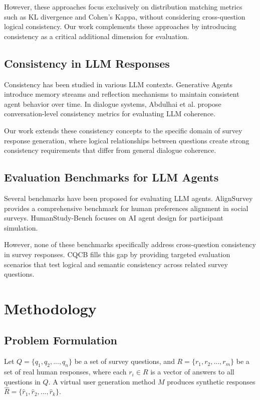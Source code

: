 \documentclass[sigconf, anonymous]{acmart}
\begin{document}
However, these approaches focus exclusively on distribution matching metrics such as KL divergence and Cohen's Kappa, without considering cross-question logical consistency. Our work complements these approaches by introducing consistency as a critical additional dimension for evaluation.

\subsection{Consistency in LLM Responses}

Consistency has been studied in various LLM contexts. Generative Agents introduce memory streams and reflection mechanisms to maintain consistent agent behavior over time. In dialogue systems, Abdulhai et al. propose conversation-level consistency metrics for evaluating LLM coherence.

Our work extends these consistency concepts to the specific domain of survey response generation, where logical relationships between questions create strong consistency requirements that differ from general dialogue coherence.

\subsection{Evaluation Benchmarks for LLM Agents}

Several benchmarks have been proposed for evaluating LLM agents. AlignSurvey provides a comprehensive benchmark for human preferences alignment in social surveys. HumanStudy-Bench focuses on AI agent design for participant simulation.

However, none of these benchmarks specifically address cross-question consistency in survey responses. CQCB fills this gap by providing targeted evaluation scenarios that test logical and semantic consistency across related survey questions.

\section{Methodology}

\subsection{Problem Formulation}

Let $Q = \{q_1, q_2, ..., q_n\}$ be a set of survey questions, and $R = \{r_1, r_2, ..., r_m\}$ be a set of real human responses, where each $r_i \in R$ is a vector of answers to all questions in $Q$. A virtual user generation method $M$ produces synthetic responses $\hat{R} = \{\hat{r}_1, \hat{r}_2, ..., \hat{r}_k\}$.
\end{document}
